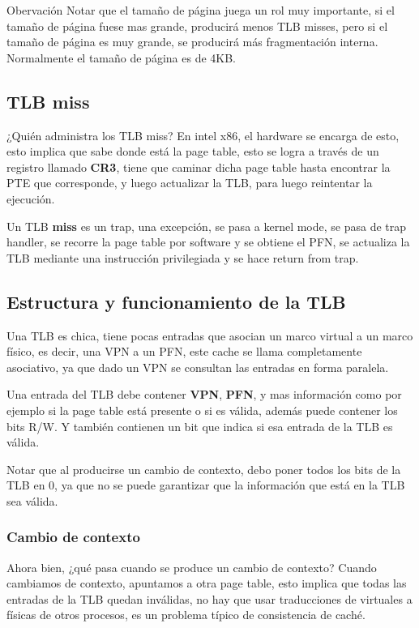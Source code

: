 \documentclass{article}
\begin{document}
\begin{summary}{Obervación}
    Notar que el tamaño de página juega un rol muy importante, si el tamaño de página fuese mas grande, producirá menos TLB misses, pero si el tamaño de página es muy grande, se producirá más fragmentación interna. Normalmente el tamaño de página es de 4KB.
\end{summary}

\subsection{TLB miss}

¿Quién administra los TLB miss? En intel x86, el hardware se encarga de esto, esto implica que sabe donde está la page table, esto se logra a través de un registro llamado \textbf{CR3}, tiene que caminar dicha page table hasta encontrar la PTE que corresponde, y luego actualizar la TLB, para luego reintentar la ejecución. 

\begin{definition}
    Un TLB \textbf{miss} es un trap, una excepción, se pasa a kernel mode, se pasa de trap handler, se recorre la page table por software y se obtiene el PFN, se actualiza la TLB mediante una instrucción privilegiada y se hace return from trap.
\end{definition}

\subsection{Estructura y funcionamiento de la TLB}
Una TLB es chica, tiene pocas entradas que asocian un marco virtual a un marco físico, es decir, una VPN a un PFN, este cache se llama completamente asociativo, ya que dado un VPN se consultan las entradas en forma paralela.

Una entrada del TLB debe contener \textbf{VPN}, \textbf{PFN}, y mas información como por ejemplo si la page table está presente o si es válida, además puede contener los bits R/W. Y también contienen un bit que indica si esa entrada de la TLB es válida. 

Notar que al producirse un cambio de contexto, debo poner todos los bits de la TLB en 0, ya que no se puede garantizar que la información que está en la TLB sea válida.

\subsubsection{Cambio de contexto}
Ahora bien, ¿qué pasa cuando se produce un cambio de contexto? Cuando cambiamos de contexto, apuntamos a otra page table, esto implica que todas las entradas de la TLB quedan inválidas, no hay que usar traducciones de virtuales a físicas de otros procesos, es un problema típico de consistencia de caché. 
\end{document}
